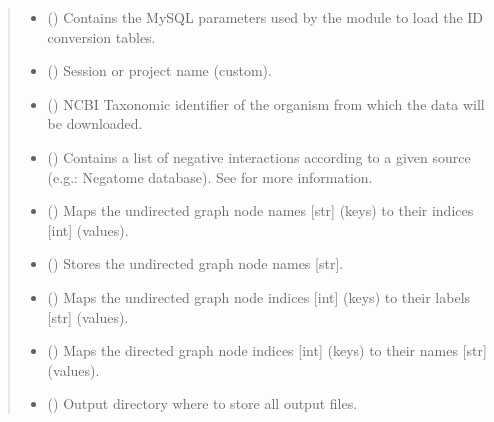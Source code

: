 \documentclass[letterpaper,10pt,english]{sphinxmanual}
\begin{document}
\begin{fulllineitems}
\begin{quote}
\begin{description}
\begin{itemize}
\item {} 
 () \textendash{} Contains the MySQL parameters used by the
 module to load the ID conversion
tables.

\item {} 
 () \textendash{} Session or project name (custom).

\item {} 
 () \textendash{} NCBI Taxonomic identifier of the organism from which the data
will be downloaded.

\item {} 
 () \textendash{} Contains a list of negative interactions according to a given
source (e.g.: Negatome database). See
{\hyperref[\detokenize{main:pypath.main.PyPath.apply_negative}]{}} for more information.

\item {} 
 () \textendash{} Maps the undirected graph node names {[}str{]} (keys) to their
indices {[}int{]} (values).

\item {} 
 () \textendash{} Stores the undirected graph node names {[}str{]}.

\item {} 
 () \textendash{} Maps the undirected graph node indices {[}int{]} (keys) to their
labels {[}str{]} (values).

\item {} 
 () \textendash{} Maps the directed graph node indices {[}int{]} (keys) to their names
{[}str{]} (values).

\item {} 
 () \textendash{} Output directory where to store all output files.


\end{itemize}
\end{description}
\end{quote}
\end{fulllineitems}
\end{document}
